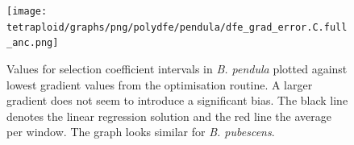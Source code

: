 \documentclass[hidelinks,11pt]{article}
\newcommand{\pendula}{\textit{B. pendula}}
\newcommand{\pubescens}{\textit{B. pubescens}}
\begin{document}
    \begin{figure}[H]
        \centering
        \texttt{[image: tetraploid/graphs/png/polydfe/pendula/dfe\_grad\_error.C.full\_anc.png]}
        \caption{Values for selection coefficient intervals in \pendula{} plotted against lowest gradient values from the optimisation routine. A larger gradient does not seem to introduce a significant bias. The black line denotes the linear regression solution and the red line the average per window. The graph looks similar for \pubescens{}.}
        \label{fig:dfe_grad_errors}
    \end{figure}
\end{document}

